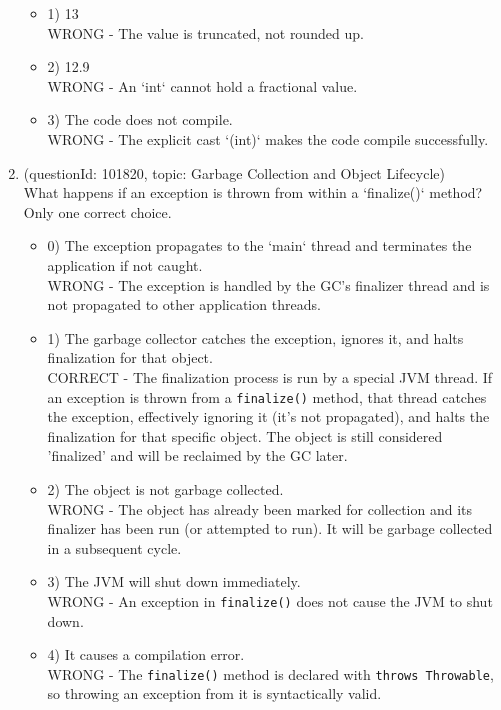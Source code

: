 \documentclass[12pt]{article}
\begin{document}
\begin{enumerate}[label=(\arabic*)]
\begin{itemize}
\item 1) 13
 \\ 
WRONG - The value is truncated, not rounded up.

\item 2) 12.9
 \\ 
WRONG - An `int` cannot hold a fractional value.

\item 3) The code does not compile.
 \\ 
WRONG - The explicit cast `(int)` makes the code compile successfully.

\end{itemize}
\item (questionId: 101820, topic: Garbage Collection and Object Lifecycle) \\ 
What happens if an exception is thrown from within a `finalize()` method?
\\ \noindent Only one correct choice. 
\begin{itemize}
\item 0) The exception propagates to the `main` thread and terminates the application if not caught.
 \\ 
WRONG - The exception is handled by the GC's finalizer thread and is not propagated to other application threads.

\item 1) The garbage collector catches the exception, ignores it, and halts finalization for that object.
 \\ 
CORRECT - The finalization process is run by a special JVM thread. If an exception is thrown from a \verb|finalize()| method, that thread catches the exception, effectively ignoring it (it's not propagated), and halts the finalization for that specific object. The object is still considered 'finalized' and will be reclaimed by the GC later.

\item 2) The object is not garbage collected.
 \\ 
WRONG - The object has already been marked for collection and its finalizer has been run (or attempted to run). It will be garbage collected in a subsequent cycle.

\item 3) The JVM will shut down immediately.
 \\ 
WRONG - An exception in \verb|finalize()| does not cause the JVM to shut down.

\item 4) It causes a compilation error.
 \\ 
WRONG - The \verb|finalize()| method is declared with \verb|throws Throwable|, so throwing an exception from it is syntactically valid.


\end{itemize}
\end{enumerate}
\end{document}
